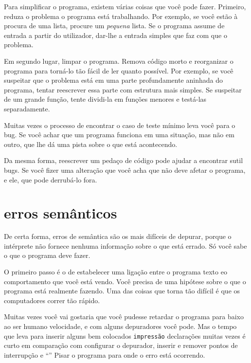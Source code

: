 \documentclass[10pt]{book}
\begin{document}
\begin{v erbatim}
Para simplificar o programa, existem várias coisas que você pode fazer. Primeiro,
reduza o problema o programa está trabalhando. Por exemplo, se você
estão à procura de uma lista, procure um {\em pequena} lista. Se o programa assume
de entrada a partir do utilizador, dar-lhe a entrada simples que faz com que o
problema.

Em segundo lugar, limpar o programa. Remova código morto e reorganizar o
programa para torná-lo tão fácil de ler quanto possível. Por exemplo, se você
suspeitar que o problema está em uma parte profundamente aninhada do programa,
tentar reescrever essa parte com estrutura mais simples. Se suspeitar de um
grande função, tente dividi-la em funções menores e testá-las
separadamente.

Muitas vezes o processo de encontrar o caso de teste mínimo leva você para o
bug. Se você achar que um programa funciona em uma situação, mas não em
outro, que lhe dá uma pista sobre o que está acontecendo.

Da mesma forma, reescrever um pedaço de código pode ajudar a encontrar sutil
bugs. Se você fizer uma alteração que você acha que não deve afetar o
programa, e ele, que pode derrubá-lo fora.


\section{erros semânticos}

De certa forma, erros de semântica são os mais difíceis de depurar,
porque o intérprete não fornece nenhuma informação
sobre o que está errado. Só você sabe o que o programa deve
fazer.

O primeiro passo é o de estabelecer uma ligação entre o programa
texto eo comportamento que você está vendo. Você precisa de uma hipótese
sobre o que o programa está realmente fazendo. Uma das coisas
que torna tão difícil é que os computadores correr tão rápido.

Muitas vezes você vai gostaria que você pudesse retardar o programa para baixo ao ser humano
velocidade, e com alguns depuradores você pode. Mas o tempo que leva para
inserir alguns bem colocados {\tt impressão} declarações muitas vezes é curto em comparação com
configurar o depurador, inserir e remover pontos de interrupção e
``'' Pisar o programa para onde o erro está ocorrendo.



\end{v erbatim}
\end{document}
